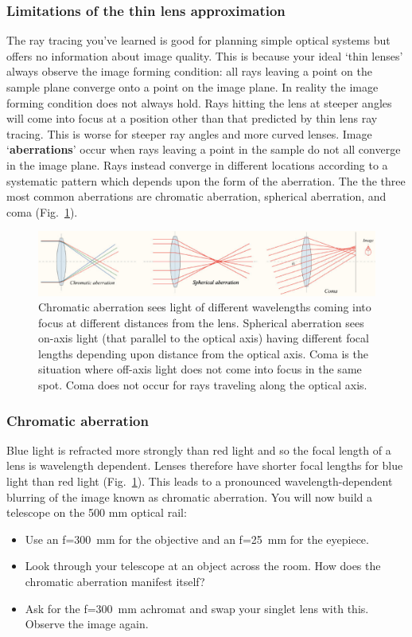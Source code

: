 \documentclass[a4paper]{report}
\begin{document}
\subsubsection{Limitations of the thin lens approximation}
The ray tracing you've learned is good for planning simple optical systems but offers no information about image quality. 
This is because your ideal `thin lenses' always observe the image forming condition: all rays leaving a point on the sample plane converge onto a point on the image plane. 
In reality the image forming condition does not always hold. 
Rays hitting the lens at steeper angles will come into focus at a position other than that predicted by thin lens ray tracing. 
This is worse for steeper ray angles and more curved lenses. 
Image `\textbf{aberrations}' occur when rays leaving a point in the sample do not all converge in the image plane.
Rays instead converge in different locations according to a systematic pattern which depends upon the form of the aberration. 
The the three most common aberrations are chromatic aberration, spherical aberration, and coma (Fig.~\ref{fig:aberrations}). 

\begin{figure}[h]
\center
\includegraphics[width=6in]{aberrations.eps}
\caption{ 
Chromatic aberration sees light of different wavelengths coming into focus at different distances from the lens.
Spherical aberration sees on-axis light (that parallel to the optical axis) having different focal lengths depending upon distance from the optical axis. 
Coma is the situation where off-axis light does not come into focus in the same spot. Coma does not occur for rays traveling along the optical axis.}
\label{fig:aberrations}
\end{figure}


\clearpage

\subsubsection{Chromatic aberration}
Blue light is refracted more strongly than red light and so the focal length of a lens is wavelength dependent. 
Lenses therefore have shorter focal lengths for blue light than red light (Fig.~\ref{fig:aberrations}).
This leads to a pronounced wavelength-dependent blurring of the image known as chromatic aberration. 
You will now build a telescope on the 500 mm optical rail:
\begin{itemize}
\item Use an f=300~mm for the objective and an f=25~mm for the eyepiece. 
\item Look through your telescope at an object across the room. How does the chromatic aberration manifest itself?
\item Ask for the f=300~mm achromat and swap your singlet lens with this. Observe the image again.
\end{itemize}
\end{document}
